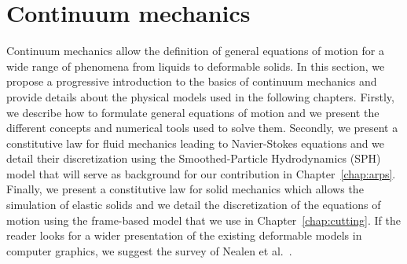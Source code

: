 \section{Continuum mechanics}
\label{sec:continuumMechanics}
Continuum mechanics allow the definition of general equations of motion for a wide range of phenomena from liquids to deformable solids. 
In this section, we propose a progressive introduction to the basics of continuum mechanics and provide details about the physical models used in the following chapters. 
Firstly, we describe how to formulate general equations of motion and we present the different concepts and numerical tools used to solve them.
Secondly, we present a constitutive law for fluid mechanics leading to Navier-Stokes equations and we detail their discretization using the Smoothed-Particle Hydrodynamics (SPH) model that will serve as background for our contribution in Chapter~\ref{chap:arps}.
Finally, we present a constitutive law for solid mechanics which allows the simulation of elastic solids and we detail the discretization of the equations of motion using the frame-based model that we use in Chapter~\ref{chap:cutting}.
If the reader looks for a wider presentation of the existing deformable models in computer graphics, we suggest the survey of Nealen et al.~\cite{Nealen2006}.
%

